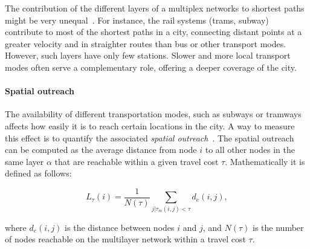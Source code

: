 The contribution of the different layers of a multiplex networks to shortest paths might be very unequal~\cite{Aleta2017Multilayer}. For instance, the rail systems (trams, subway) contribute to most of the shortest paths in a city, connecting distant points at a greater velocity and in straighter routes than bus or other transport modes. However, such layers have only few stations. Slower and more local transport modes often serve a complementary role, offering a deeper coverage of the city.

\paragraph*{Spatial outreach}
The availability of different transportation modes, such as subways or tramways affects how easily it is to reach certain locations in the city. A way to measure this effect is to quantify the associated \textit{spatial outreach}~\cite{strano2015features}. The spatial outreach can be computed as the average distance from node $i$ to all other nodes in the same layer $\alpha$ that are reachable within a given travel cost $\tau$. Mathematically it is defined as follows:

\begin{equation}
    L_\tau(i)=\frac{1}{N(\tau)}\sum_{j|\tau_{m}(i,j)<\tau}d_e(i,j),
    \label{eq:outreach}
\end{equation}

where $d_e(i,j)$ is the distance between nodes $i$ and $j$, and $N(\tau)$ is the number of nodes reachable on the multilayer network within a travel cost $\tau$.

